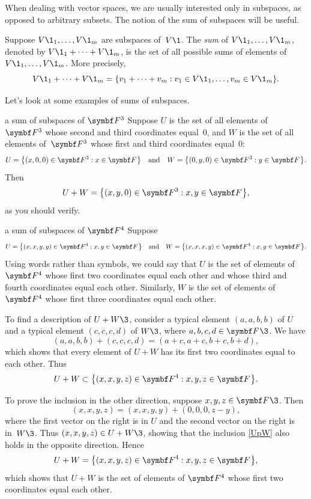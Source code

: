 When dealing with vector spaces, we are usually interested only in \mbox{subspaces}, as opposed to arbitrary
subsets. The notion of the sum of subspaces will be useful.

\smallskip %

{Suppose $V\1_1, \dots, V\1_m$ are subspaces of~$V\1$.  The
\emph{sum} of $V\1_1, \dots, V\1_m$, denoted by $V\1_1 + \dots + V\1_m$, is the set of all possible sums of elements
of $V\1_1, \dots, V\1_m$.  More precisely,
\[
V\1_1 + \dots + V\1_m = \{ v_1 + \dots + v_m: v_1 \in V\1_1, \dots, v_m \in V\1_m \}.
\]}

\pagebreak[3]

Let's look at some examples of sums of subspaces.

\begin{example}{a sum of subspaces of\/ $\F{3}$}
Suppose $U$ is the set of all elements of~$\F{3}$ whose second and third coordinates equal~$0$, and
$W$ is the set of all elements of~$\F{3}$ whose first and third coordinates equal~$0$:
\[
U = \br[\big]{(x, 0, 0) \in \F{3}: x \in \F{}} \andd W = \br[\big]{(0, y, 0) \in \F{3}: y \in \F{}}.
\]
Then
\[
U + W = \br[\big]{(x, y, 0) \in \F{3}: x, y \in \F{}},
\]
as you should verify.
\end{example}

\begin{example}{a sum of subspaces of\/ $\F{4}$}
Suppose
\[
U = \br[\big]{(x, x, y, y)\in\F{4}: x, y \in \F{}} \andd W = \br[\big]{(x, x, x, y) \in \F{4}: x, y \in \F{}}.
\]
Using words rather than symbols, we could say that $U$ is the set of elements of $\F4$ whose first two coordinates equal each other and whose third and fourth coordinates equal each other. Similarly, $W$ is the set of elements of $\F4$ whose first three coordinates equal each other.

To find a description of $U + W\3$, consider a typical element $(a, a, b, b)$ of $U$ and a typical element $(c,c, c, d)$ of $W\3$, where $a, b, c, d \in \F{}\3$. We have
\[
(a, a, b, b) + (c, c, c, d) = (a + c, a+c, b+c, b+d),
\]
which shows that every element of $U + W$ has its first two coordinates equal to each other. Thus
\begin{equation} \label{UpW}
U + W \subset \br[\big]{(x, x, y, z) \in \F{4}: x, y, z \in \F{}}.
\end{equation}

To prove the inclusion in the other direction, suppose $x, y, z \in \F{}\3$. Then
\[
(x, x, y, z) = (x,x,y,y) + (0, 0, 0, z-y),
\]
where the first vector on the right is in $U$ and the second vector on the right is in~$W\3$. Thus $(x, x, y, z) \in U + W\3$, showing that the inclusion \ref{UpW} also holds in the opposite direction. Hence
\[
U + W = \br[\big]{(x, x, y, z) \in \F{4}: x, y, z \in \F{}},
\]
which shows that $U + W$ is the set of elements of $\F4$ whose first two coordinates equal each other.
\end{example}

